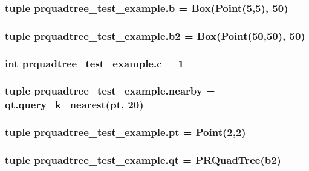\subsubsection[{b}]{\setlength{\rightskip}{0pt plus 5cm}tuple prquadtree\+\_\+test\+\_\+example.\+b = {\bf Box}({\bf Point}(5,5), 50)}\label{namespaceprquadtree__test__example_a430c6e4c1960cb0326d40a60be817d65}
\hypertarget{namespaceprquadtree__test__example_a6c76891a5f566a70e8ab91c9946be5a2}{}
\subsubsection[{b2}]{\setlength{\rightskip}{0pt plus 5cm}tuple prquadtree\+\_\+test\+\_\+example.\+b2 = {\bf Box}({\bf Point}(50,50), 50)}\label{namespaceprquadtree__test__example_a6c76891a5f566a70e8ab91c9946be5a2}
\hypertarget{namespaceprquadtree__test__example_a51f7199631c374c21ed3dada86cc3766}{}
\subsubsection[{c}]{\setlength{\rightskip}{0pt plus 5cm}int prquadtree\+\_\+test\+\_\+example.\+c = 1}\label{namespaceprquadtree__test__example_a51f7199631c374c21ed3dada86cc3766}
\hypertarget{namespaceprquadtree__test__example_a2024920106d8770dc2cfa9da1e4fe410}{}
\subsubsection[{nearby}]{\setlength{\rightskip}{0pt plus 5cm}tuple prquadtree\+\_\+test\+\_\+example.\+nearby = qt.\+query\+\_\+k\+\_\+nearest({\bf pt}, 20)}\label{namespaceprquadtree__test__example_a2024920106d8770dc2cfa9da1e4fe410}
\hypertarget{namespaceprquadtree__test__example_ab0091dbc0243fa027e0bc7025d8ea3ad}{}
\subsubsection[{pt}]{\setlength{\rightskip}{0pt plus 5cm}tuple prquadtree\+\_\+test\+\_\+example.\+pt = {\bf Point}(2,2)}\label{namespaceprquadtree__test__example_ab0091dbc0243fa027e0bc7025d8ea3ad}
\hypertarget{namespaceprquadtree__test__example_a92699a8bb92121b0ffdac66d511f3359}{}
\subsubsection[{qt}]{\setlength{\rightskip}{0pt plus 5cm}tuple prquadtree\+\_\+test\+\_\+example.\+qt = {\bf P\+R\+Quad\+Tree}({\bf b2})}\label{namespaceprquadtree__test__example_a92699a8bb92121b0ffdac66d511f3359}
